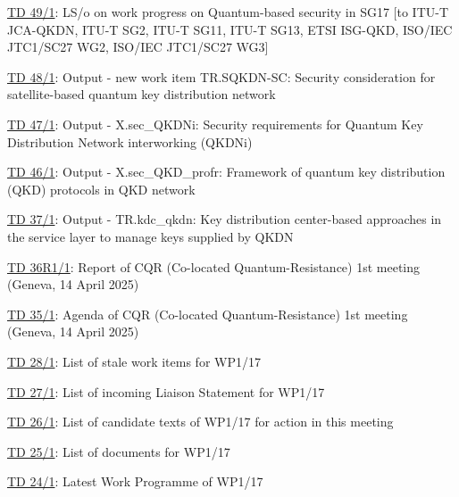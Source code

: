 \href{https://www.itu.int/md/meetingdoc.asp?lang=en\&parent=T25-SG17-250408-TD-WP1-0049}{TD 49/1}: LS/o on work progress on Quantum-based security in SG17 [to ITU-T JCA-QKDN, ITU-T SG2, ITU-T SG11, ITU-T SG13, ETSI ISG-QKD, ISO/IEC JTC1/SC27 WG2, ISO/IEC JTC1/SC27 WG3]

\href{https://www.itu.int/md/meetingdoc.asp?lang=en\&parent=T25-SG17-250408-TD-WP1-0048}{TD 48/1}: Output - new work item TR.SQKDN-SC: Security consideration for satellite-based quantum key distribution network

\href{https://www.itu.int/md/meetingdoc.asp?lang=en\&parent=T25-SG17-250408-TD-WP1-0047}{TD 47/1}: Output - X.sec\_QKDNi: Security requirements for Quantum Key Distribution Network interworking (QKDNi)

\href{https://www.itu.int/md/meetingdoc.asp?lang=en\&parent=T25-SG17-250408-TD-WP1-0046}{TD 46/1}: Output - X.sec\_QKD\_profr: Framework of quantum key distribution (QKD) protocols in QKD network

\href{https://www.itu.int/md/meetingdoc.asp?lang=en\&parent=T25-SG17-250408-TD-WP1-0037}{TD 37/1}: Output - TR.kdc\_qkdn: Key distribution center-based approaches in the service layer to manage keys supplied by QKDN

\href{https://www.itu.int/md/meetingdoc.asp?lang=en\&parent=T25-SG17-250408-TD-WP1-0036}{TD 36R1/1}: Report of CQR (Co-located Quantum-Resistance) 1st meeting (Geneva, 14 April 2025)

\href{https://www.itu.int/md/meetingdoc.asp?lang=en\&parent=T25-SG17-250408-TD-WP1-0035}{TD 35/1}: Agenda of CQR (Co-located Quantum-Resistance) 1st meeting (Geneva, 14 April 2025)

\href{https://www.itu.int/md/meetingdoc.asp?lang=en\&parent=T25-SG17-250408-TD-WP1-0028}{TD 28/1}: List of stale work items for WP1/17

\href{https://www.itu.int/md/meetingdoc.asp?lang=en\&parent=T25-SG17-250408-TD-WP1-0027}{TD 27/1}: List of incoming Liaison Statement for WP1/17

\href{https://www.itu.int/md/meetingdoc.asp?lang=en\&parent=T25-SG17-250408-TD-WP1-0026}{TD 26/1}: List of candidate texts of WP1/17 for action in this meeting

\href{https://www.itu.int/md/meetingdoc.asp?lang=en\&parent=T25-SG17-250408-TD-WP1-0025}{TD 25/1}: List of documents for WP1/17

\href{https://www.itu.int/md/meetingdoc.asp?lang=en\&parent=T25-SG17-250408-TD-WP1-0024}{TD 24/1}: Latest Work Programme of WP1/17

